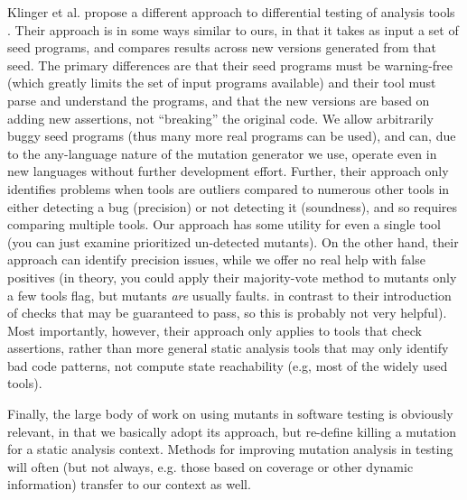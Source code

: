 Klinger et al. propose a different approach to differential testing of analysis tools \cite{klinger2019differentially}.  Their approach is in some ways similar to ours, in that it takes as input a set of seed programs, and compares results across new versions generated from that seed.  The primary differences are that their seed programs must be warning-free (which greatly limits the set of input programs available) and their tool must parse and understand the programs, and that the new versions are based on adding new assertions, not ``breaking'' the original code.  We allow arbitrarily buggy seed programs (thus many more real programs can be used), and can, due to the any-language nature of the mutation generator we use, operate even in new languages without further development effort.  Further, their approach only identifies problems when tools are outliers compared to numerous other tools in either detecting a bug (precision) or not detecting it (soundness), and so requires comparing multiple tools.  Our approach has some utility for even a single tool (you can just examine prioritized un-detected mutants).  On the other hand, their approach can identify precision issues, while we offer no real help with false positives (in theory, you could apply their majority-vote method to mutants only a few tools flag, but mutants \emph{are} usually faults. in contrast to their introduction of checks that may be guaranteed to pass, so this is probably not very helpful).  Most importantly, however, their approach only applies to tools that check assertions, rather than more general static analysis tools that may only identify bad code patterns, not compute state reachability (e.g, most of the widely used tools).

Finally, the large body of work on using mutants in software testing \cite{demillo1978hints,budd1980theoretical, groce2015verified,groce2018verified,MutGoogle,ivankovic2018industrial,mutKernel} is obviously relevant, in that we basically adopt its approach, but re-define killing a mutation for a static analysis context.  Methods for improving mutation analysis in testing will often (but not always, e.g. those based on coverage or other dynamic information) transfer to our context as well.